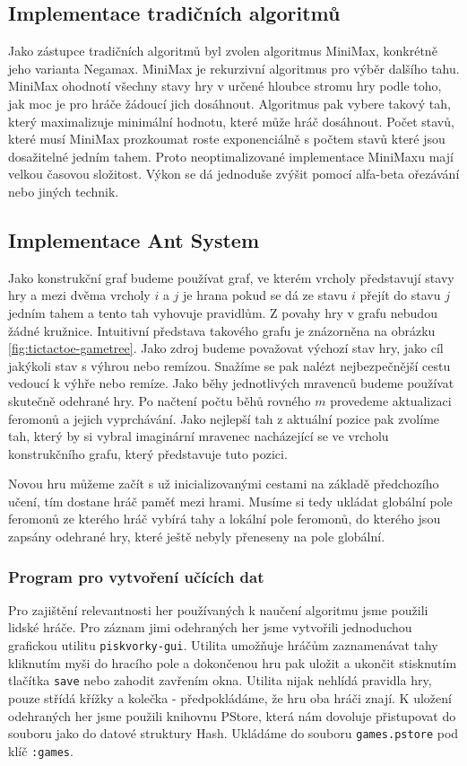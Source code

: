 \documentclass[12pt]{article}
\begin{document}
\subsection{Implementace tradičních algoritmů}
Jako zástupce tradičních algoritmů byl zvolen algoritmus MiniMax, konkrétně jeho varianta Negamax. MiniMax je rekurzivní algoritmus pro výběr dalšího tahu. MiniMax ohodnotí všechny stavy hry v určené hloubce stromu hry podle toho, jak moc je pro hráče žádoucí jich dosáhnout. Algoritmus pak vybere takový tah, který maximalizuje minimální hodnotu, které může hráč dosáhnout. Počet stavů, které musí MiniMax prozkoumat roste exponenciálně s počtem stavů které jsou dosažitelné jedním tahem. Proto neoptimalizované implementace MiniMaxu mají velkou časovou složitost. Výkon se dá jednoduše zvýšit pomocí alfa-beta ořezávání nebo jiných technik. 

\subsection{Implementace Ant System}
Jako konstrukční graf budeme používat graf, ve kterém vrcholy představují stavy hry a mezi dvěma vrcholy $i$ a $j$ je hrana pokud se dá ze stavu $i$ přejít do stavu $j$ jedním tahem a tento tah vyhovuje pravidlům. Z povahy hry v grafu nebudou žádné kružnice. Intuitivní představa takového grafu je znázorněna na obrázku \ref{fig:tictactoe-gametree}.
Jako zdroj budeme považovat výchozí stav hry, jako cíl jakýkoli stav s výhrou nebo remízou. Snažíme se pak nalézt nejbezpečnější cestu vedoucí k výhře nebo remíze. Jako běhy jednotlivých mravenců budeme používat skutečně odehrané hry. Po načtení počtu běhů rovného $m$ provedeme aktualizaci feromonů a jejich vyprchávání. Jako nejlepší tah z aktuální pozice pak zvolíme tah, který by si vybral imaginární mravenec nacházející se ve vrcholu konstrukčního grafu, který představuje tuto pozici.

Novou hru můžeme začít s už inicializovanými cestami na základě předchozího učení, tím dostane hráč paměť mezi hrami. Musíme si tedy ukládat globální pole feromonů ze kterého hráč vybírá tahy a lokální pole feromonů, do kterého jsou zapsány odehrané hry, které ještě nebyly přeneseny na pole globální.

\subsubsection{Program pro vytvoření učících dat}
Pro zajištění relevantnosti her používaných k naučení algoritmu jsme použili lidské hráče. Pro záznam jimi odehraných her jsme vytvořili jednoduchou grafickou utilitu \texttt{piskvorky-gui}. Utilita umožňuje hráčům zaznamenávat tahy kliknutím myši do hracího pole a dokončenou hru pak uložit a ukončit stisknutím tlačítka \texttt{save} nebo zahodit zavřením okna. Utilita nijak nehlídá pravidla hry, pouze střídá křížky a kolečka - předpokládáme, že hru oba hráči znají. K uložení odehraných her jsme použili knihovnu PStore, která nám dovoluje přistupovat do souboru jako do datové struktury Hash. Ukládáme do souboru \texttt{games.pstore} pod klíč \texttt{:games}.
\end{document}
